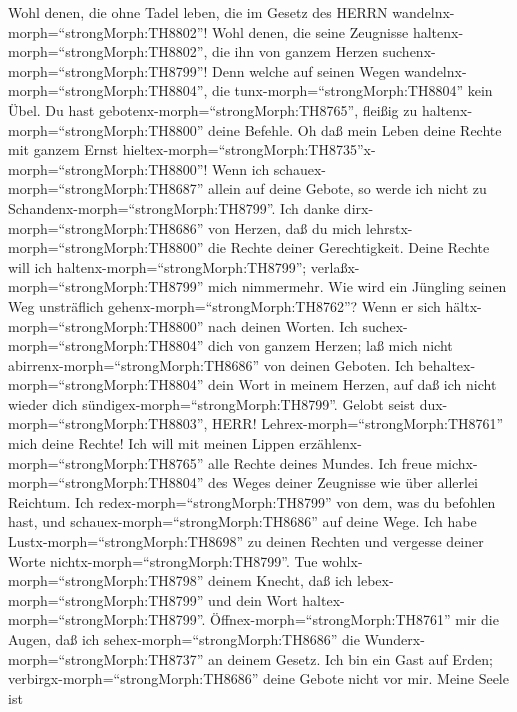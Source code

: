  Wohl denen, die ohne Tadel leben, die im Gesetz des HERRN
wandelnx-morph=``strongMorph:TH8802''!  Wohl denen, die
seine Zeugnisse haltenx-morph=``strongMorph:TH8802'', die ihn von ganzem
Herzen suchenx-morph=``strongMorph:TH8799''!  Denn welche
auf seinen Wegen wandelnx-morph=``strongMorph:TH8804'', die
tunx-morph=``strongMorph:TH8804'' kein Übel.  Du hast
gebotenx-morph=``strongMorph:TH8765'', fleißig zu
haltenx-morph=``strongMorph:TH8800'' deine Befehle.  Oh daß
mein Leben deine Rechte mit ganzem Ernst
hieltex-morph=``strongMorph:TH8735''x-morph=``strongMorph:TH8800''!
 Wenn ich schauex-morph=``strongMorph:TH8687'' allein auf
deine Gebote, so werde ich nicht zu
Schandenx-morph=``strongMorph:TH8799''.  Ich danke
dirx-morph=``strongMorph:TH8686'' von Herzen, daß du mich
lehrstx-morph=``strongMorph:TH8800'' die Rechte deiner Gerechtigkeit.
 Deine Rechte will ich haltenx-morph=``strongMorph:TH8799'';
verlaßx-morph=``strongMorph:TH8799'' mich nimmermehr.  Wie
wird ein Jüngling seinen Weg unsträflich
gehenx-morph=``strongMorph:TH8762''? Wenn er sich
hältx-morph=``strongMorph:TH8800'' nach deinen Worten.  Ich
suchex-morph=``strongMorph:TH8804'' dich von ganzem Herzen; laß mich
nicht abirrenx-morph=``strongMorph:TH8686'' von deinen Geboten.
 Ich behaltex-morph=``strongMorph:TH8804'' dein Wort in
meinem Herzen, auf daß ich nicht wieder dich
sündigex-morph=``strongMorph:TH8799''.  Gelobt seist
dux-morph=``strongMorph:TH8803'', HERR!
Lehrex-morph=``strongMorph:TH8761'' mich deine Rechte!  Ich
will mit meinen Lippen erzählenx-morph=``strongMorph:TH8765'' alle
Rechte deines Mundes.  Ich freue
michx-morph=``strongMorph:TH8804'' des Weges deiner Zeugnisse wie über
allerlei Reichtum.  Ich redex-morph=``strongMorph:TH8799''
von dem, was du befohlen hast, und schauex-morph=``strongMorph:TH8686''
auf deine Wege.  Ich habe
Lustx-morph=``strongMorph:TH8698'' zu deinen Rechten und vergesse deiner
Worte nichtx-morph=``strongMorph:TH8799''.  Tue
wohlx-morph=``strongMorph:TH8798'' deinem Knecht, daß ich
lebex-morph=``strongMorph:TH8799'' und dein Wort
haltex-morph=``strongMorph:TH8799''. 
Öffnex-morph=``strongMorph:TH8761'' mir die Augen, daß ich
sehex-morph=``strongMorph:TH8686'' die
Wunderx-morph=``strongMorph:TH8737'' an deinem Gesetz.  Ich
bin ein Gast auf Erden; verbirgx-morph=``strongMorph:TH8686'' deine
Gebote nicht vor mir.  Meine Seele ist
